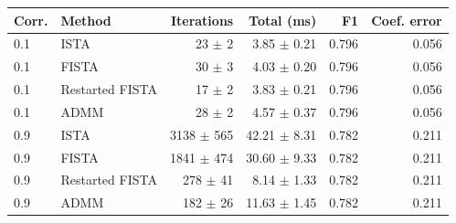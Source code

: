 \begin{tabular}{llrrrr}
\toprule
Corr. & Method & Iterations & Total (ms) & F1 & Coef. error \\
\midrule
0.1 & ISTA & 23 $\pm$ 2 & 3.85 $\pm$ 0.21 & 0.796 & 0.056 \\
0.1 & FISTA & 30 $\pm$ 3 & 4.03 $\pm$ 0.20 & 0.796 & 0.056 \\
0.1 & Restarted FISTA & 17 $\pm$ 2 & 3.83 $\pm$ 0.21 & 0.796 & 0.056 \\
0.1 & ADMM & 28 $\pm$ 2 & 4.57 $\pm$ 0.37 & 0.796 & 0.056 \\
0.9 & ISTA & 3138 $\pm$ 565 & 42.21 $\pm$ 8.31 & 0.782 & 0.211 \\
0.9 & FISTA & 1841 $\pm$ 474 & 30.60 $\pm$ 9.33 & 0.782 & 0.211 \\
0.9 & Restarted FISTA & 278 $\pm$ 41 & 8.14 $\pm$ 1.33 & 0.782 & 0.211 \\
0.9 & ADMM & 182 $\pm$ 26 & 11.63 $\pm$ 1.45 & 0.782 & 0.211 \\
\bottomrule
\end{tabular}
